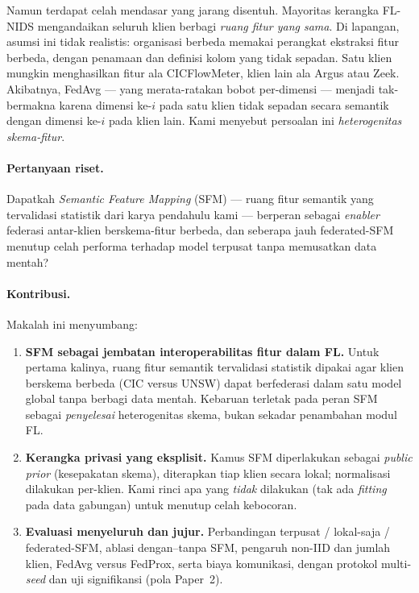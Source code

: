 \documentclass[11pt,a4paper]{article}
\begin{document}
Namun terdapat celah mendasar yang jarang disentuh. Mayoritas kerangka FL-NIDS
mengandaikan seluruh klien berbagi \emph{ruang fitur yang sama}. Di lapangan,
asumsi ini tidak realistis: organisasi berbeda memakai perangkat ekstraksi fitur
berbeda, dengan penamaan dan definisi kolom yang tidak sepadan. Satu klien
mungkin menghasilkan fitur ala CICFlowMeter, klien lain ala Argus atau Zeek.
Akibatnya, FedAvg \cite{popoola} --- yang merata-ratakan bobot per-dimensi ---
menjadi tak-bermakna karena dimensi ke-$i$ pada satu klien tidak sepadan secara
semantik dengan dimensi ke-$i$ pada klien lain. Kami menyebut persoalan ini
\emph{heterogenitas skema-fitur}.

\paragraph{Pertanyaan riset.} Dapatkah \emph{Semantic Feature Mapping} (SFM) ---
ruang fitur semantik yang tervalidasi statistik dari karya pendahulu kami
\cite{sfm} --- berperan sebagai \emph{enabler} federasi antar-klien
berskema-fitur berbeda, dan seberapa jauh federated-SFM menutup celah performa
terhadap model terpusat tanpa memusatkan data mentah?

\paragraph{Kontribusi.} Makalah ini menyumbang:
\begin{enumerate}
  \item \textbf{SFM sebagai jembatan interoperabilitas fitur dalam FL.} Untuk
  pertama kalinya, ruang fitur semantik tervalidasi statistik dipakai agar klien
  berskema berbeda (CIC versus UNSW) dapat berfederasi dalam satu model global
  tanpa berbagi data mentah. Kebaruan terletak pada peran SFM sebagai
  \emph{penyelesai} heterogenitas skema, bukan sekadar penambahan modul FL.
  \item \textbf{Kerangka privasi yang eksplisit.} Kamus SFM diperlakukan sebagai
  \emph{public prior} (kesepakatan skema), diterapkan tiap klien secara lokal;
  normalisasi dilakukan per-klien. Kami rinci apa yang \emph{tidak} dilakukan
  (tak ada \emph{fitting} pada data gabungan) untuk menutup celah kebocoran.
  \item \textbf{Evaluasi menyeluruh dan jujur.} Perbandingan terpusat / lokal-saja
  / federated-SFM, ablasi dengan--tanpa SFM, pengaruh non-IID dan jumlah klien,
  FedAvg versus FedProx, serta biaya komunikasi, dengan protokol multi-\emph{seed}
  dan uji signifikansi (pola Paper~2).
\end{enumerate}
\end{document}
